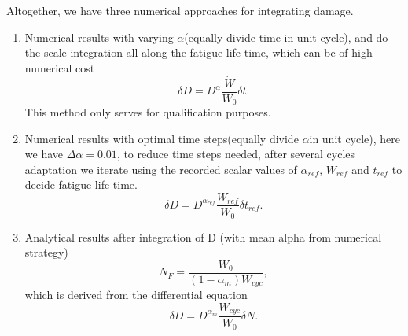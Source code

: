 \documentclass[3p,times,procedia,number]{elsarticle}
\begin{document}
\newpage

Altogether, we have three numerical approaches for integrating damage.

\begin{enumerate}
	\item  Numerical results with varying $\alpha$(equally divide time in unit cycle), and do the scale integration all along the fatigue life time, which can be of high numerical cost$$\delta D=D^\alpha\frac{\dot{W}}{W_0}\delta t.$$
	This method only serves for qualification purposes.
	\vspace{6pt}
	
	\item  Numerical results with optimal time steps(equally divide $\alpha$in unit cycle), here we have $\Delta\alpha=0.01$, to reduce time steps needed, after several cycles adaptation we iterate using the recorded scalar values of $\alpha_{ref}$, $W_{ref}$ and $t_{ref}$ to decide fatigue life time.
	$$\delta D=D^{\alpha_{ref}}\frac{W_{ref}}{W_0}\delta t_{ref}.$$
	\vspace{6pt}
	
	\item  Analytical results after integration of D (with mean alpha from numerical strategy)$$N_F=\frac{W_0}{( 1-\alpha_m)W_{cyc}},$$ 
	which is derived from the differential equation
	$$\delta D=D^{\alpha_m}\frac{W_{cyc}}{W_0}\delta N.$$
\end{enumerate}	
\end{document}

